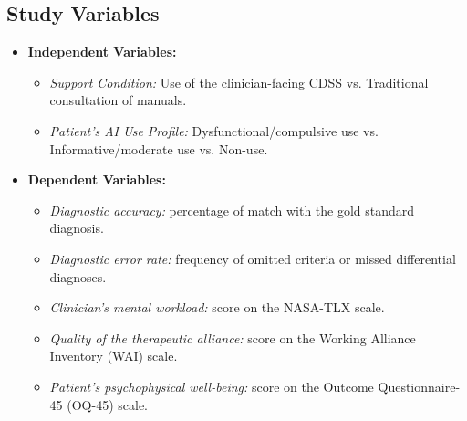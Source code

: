 \documentclass[11pt,a4paper]{article}
\begin{document}
\subsection{Study Variables}
\begin{itemize}
    \item \textbf{Independent Variables:}
    \begin{itemize}
        \item \textit{Support Condition:} Use of the clinician-facing CDSS vs. Traditional consultation of manuals.
        \item \textit{Patient's AI Use Profile:} Dysfunctional/compulsive use vs. Informative/moderate use vs. Non-use.
    \end{itemize}
    \item \textbf{Dependent Variables:}
    \begin{itemize}
        \item \textit{Diagnostic accuracy:} percentage of match with the gold standard diagnosis.
        \item \textit{Diagnostic error rate:} frequency of omitted criteria or missed differential diagnoses.
        \item \textit{Clinician's mental workload:} score on the NASA-TLX scale.
        \item \textit{Quality of the therapeutic alliance:} score on the Working Alliance Inventory (WAI) scale.
        \item \textit{Patient's psychophysical well-being:} score on the Outcome Questionnaire-45 (OQ-45) scale.
    \end{itemize}
\end{itemize}
\end{document}
